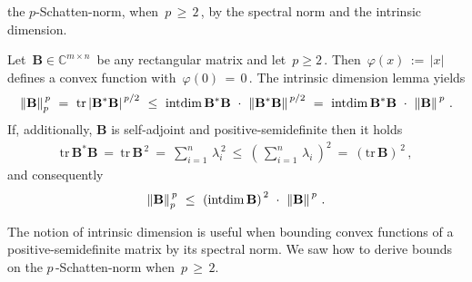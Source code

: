 the $p$-Schatten-norm, when $\,p\,\ge\, 2\,$, by the spectral norm and the intrinsic dimension.
  \begin{example*}
    Let 
    $
    \,
      \mathbf{B} \in \mathbb{C}^{m\times n}
      \,
    $
    be any rectangular matrix and let $\,p\ge 2\,$.
    Then 
    $
    \,
      \varphi(x)
      \,
      :=
      \,
      \left| x \right|
      \,
    $
  defines a convex function with $\,\varphi(0)\,=\,0\,$.
  The intrinsic dimension lemma yields
  \begin{gather*}
    \norm{\mathbf{B}}^{\,p}_p
    \ 
    =
    \ 
    \mathrm{tr}
      \left|
      \mathbf{B}^* \mathbf{B}
      \right|
      ^{\,p/2}
      \ 
    \le
    \ 
    \mathrm{intdim}
    \,
      \mathbf{B}^* \mathbf{B}
      \ 
      \cdot
      \ 
      \norm{
      \mathbf{B}^* \mathbf{B}
    }^{\,p/2}
    \ 
    =
    \ 
    \mathrm{intdim}
    \,
      \mathbf{B}^* \mathbf{B}
      \ 
      \cdot
      \ 
      \norm{
        \mathbf{B}
    }^{\,p}
    \,.
  \end{gather*}
  If, additionally, $\mathbf{B}$ is self-adjoint and positive-semidefinite
  then it holds 
  \begin{gather*}
    \mathrm{tr}
    \,
      \mathbf{B}^* \mathbf{B}
      \ 
    =
    \ 
    \mathrm{tr}
    \,
    \mathbf{B}^{\,2}
    \ 
    =
    \ 
    \sum_{i=1}^{n} 
    \,
    \lambda_i^{\,2}
    \ 
    \le 
    \ 
    \left( 
      \,
    \sum_{i=1}^{n} 
    \,
    \lambda_i
    \,
    \right)
    ^{\!2}
    \ 
    =
    \ 
    \left( 
    \mathrm{tr}
    \,
    \mathbf{B}
    \right)
    ^{\,2}
    \,,
  \end{gather*}
  and consequently
  \begin{gather*}
    \norm{\mathbf{B}}^{\,p}_{p}
    \ 
    \le
    \ 
    \left( 
    \mathrm{intdim}
    \,
    \mathbf{B}
    \right)
    ^{\,2}
    \ 
      \cdot
      \ 
      \norm{
        \mathbf{B}
    }^{\,p}
    \,.
  \end{gather*}
  \end{example*}


\begin{takeaways}
  The notion of intrinsic dimension is useful when bounding convex
  functions of a positive-semidefinite matrix by its spectral norm.
  We saw how to derive bounds on the $p\,$-Schatten-norm when $\,p\,\ge\, 2$.
\end{takeaways}
